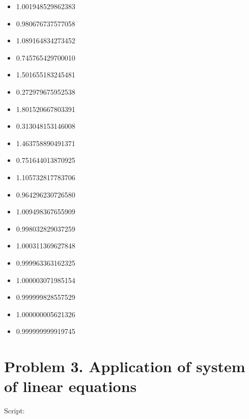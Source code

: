 \documentclass[]{article}
\providecommand{\tightlist}{%
  \setlength{\itemsep}{0pt}\setlength{\parskip}{0pt}}
\begin{document}
\begin{itemize}
\tightlist
\item
  1.001948529862383
\item
  0.980676737577058
\item
  1.089164834273452
\item
  0.745765429700010
\item
  1.501655183245481
\item
  0.272979675952538
\item
  1.801520667803391
\item
  0.313048153146008
\item
  1.463758890491371
\item
  0.751644013870925
\item
  1.105732817783706
\item
  0.964296230726580
\item
  1.009498367655909
\item
  0.998032829037259
\item
  1.000311369627848
\item
  0.999963363162325
\item
  1.000003071985154
\item
  0.999999828557529
\item
  1.000000005621326
\item
  0.999999999919745
\end{itemize}

\section{Problem 3. Application of system of linear
equations}\label{problem-3.-application-of-system-of-linear-equations}

Script:
\end{document}
